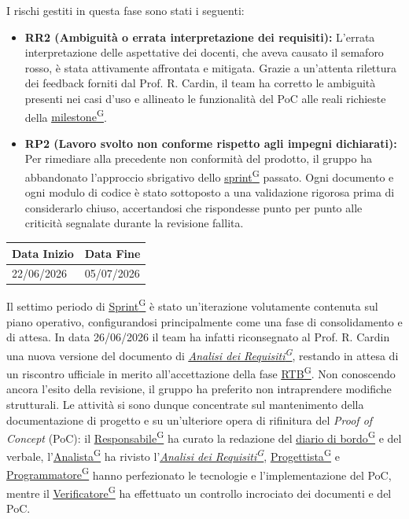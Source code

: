 \documentclass[a4paper,12pt]{article}
\newcounter{subsubsubsection}[subsubsection]
\providecommand{\glslink}[2]{\href{https://alittlebyte-19.github.io/Documentazione/glossario.html\#gls-#1}{\underline{#2}\textsuperscript{\scriptsize G}}}
\begin{document}
I rischi gestiti in questa fase sono stati i seguenti:
\begin{itemize}
    \item \textbf{RR2 (Ambiguità o errata interpretazione dei requisiti):} L'errata interpretazione delle aspettative dei docenti, che aveva causato il semaforo rosso, è stata attivamente affrontata e mitigata. Grazie a un'attenta rilettura dei feedback forniti dal Prof. R. Cardin, il team ha corretto le ambiguità presenti nei casi d'uso e allineato le funzionalità del PoC alle reali richieste della \glslink{milestone}{milestone}.
    \item \textbf{RP2 (Lavoro svolto non conforme rispetto agli impegni dichiarati):} Per rimediare alla precedente non conformità del prodotto, il gruppo ha abbandonato l'approccio sbrigativo dello \glslink{sprint}{sprint} passato. Ogni documento e ogni modulo di codice è stato sottoposto a una validazione rigorosa prima di considerarlo chiuso, accertandosi che rispondesse punto per punto alle criticità segnalate durante la revisione fallita.
\end{itemize}


\label{sec:rtb_settimoperiodo}
\begin{table}[H]
    \centering
    \renewcommand{\arraystretch}{1.5}
    \begin{tabularx}{\textwidth}{|X|X|}
    \hline \rowcolor{Dandelion!50}
    \textbf{Data Inizio} & \textbf{Data Fine}\\
    \hline
    22/06/2026 & 05/07/2026\\
    \hline

    \end{tabularx}
\end{table}

Il settimo periodo di \glslink{sprint}{Sprint} è stato un'iterazione volutamente contenuta sul piano operativo, configurandosi principalmente come una fase di consolidamento e di attesa. In data 26/06/2026 il team ha infatti riconsegnato al Prof. R. Cardin una nuova versione del documento di \textit{\glslink{analisi-dei-requisiti-adr}{Analisi dei Requisiti}}, restando in attesa di un riscontro ufficiale in merito all'accettazione della fase \glslink{rtb-requirements-and-technology-baseline}{RTB}.
Non conoscendo ancora l'esito della revisione, il gruppo ha preferito non intraprendere modifiche strutturali. Le attività si sono dunque concentrate sul mantenimento della documentazione di progetto e su un'ulteriore opera di rifinitura del \textit{Proof of Concept} (PoC): il \glslink{responsabile}{Responsabile} ha curato la redazione del \glslink{diario-di-bordo}{diario di bordo} e del verbale, l'\glslink{analista}{Analista} ha rivisto l'\textit{\glslink{analisi-dei-requisiti-adr}{Analisi dei Requisiti}}, \glslink{progettista}{Progettista} e \glslink{programmatore}{Programmatore} hanno perfezionato le tecnologie e l'implementazione del PoC, mentre il \glslink{verificatore}{Verificatore} ha effettuato un controllo incrociato dei documenti e del PoC.
\end{document}
